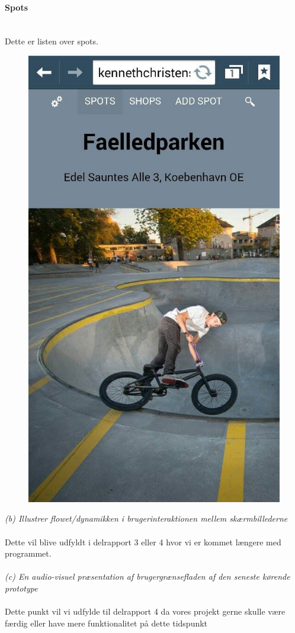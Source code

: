 \documentclass[12pt]{article}
\begin{document}
\paragraph{Spots}\mbox{}\\
Dette er listen over spots.\\
\begin{figure}[h]
\includegraphics[scale = 0.3]{spot}
\end{figure}

\newpage
\textit{(b) Illustrer flowet/dynamikken i brugerinteraktionen mellem skærmbillederne}\\\\
Dette vil blive udfyldt i delrapport 3 eller 4 hvor vi er kommet længere med programmet.\\\\
\textit{(c) En audio-visuel præsentation af brugergrænsefladen af den seneste kørende prototype}\\\\
Dette punkt vil vi udfylde til delrapport 4 da vores projekt gerne skulle være færdig eller have mere funktionalitet på dette tidspunkt\\\\
\end{document}
